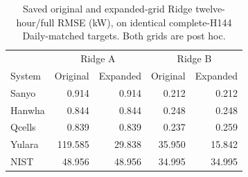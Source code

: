 \begin{table}[!tp]\caption{Saved original and expanded-grid Ridge twelve-hour/full RMSE (kW), on identical complete-H144 Daily-matched targets. Both grids are post hoc.}\label{tab:ridge}\centering\small\begin{tabular}{lrrrr}\toprule & \multicolumn{2}{c}{Ridge A} & \multicolumn{2}{c}{Ridge B}\\ System & Original & Expanded & Original & Expanded\\\midrule
Sanyo & 0.914 & 0.914 & 0.212 & 0.212\\
Hanwha & 0.844 & 0.844 & 0.248 & 0.248\\
Qcells & 0.839 & 0.839 & 0.237 & 0.259\\
Yulara & 119.585 & 29.838 & 35.950 & 15.842\\
NIST & 48.956 & 48.956 & 34.995 & 34.995\\
\bottomrule\end{tabular}\end{table}
